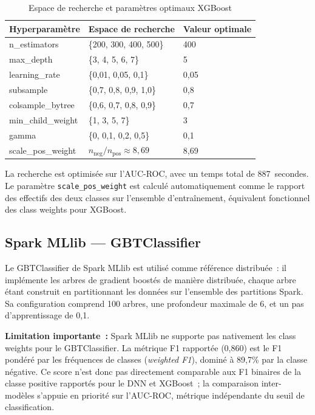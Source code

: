 \begin{table}[H]
\centering
\caption{Espace de recherche et paramètres optimaux XGBoost}
\label{tab:xgb_params}
\begin{tabular}{lll}
\toprule
\textbf{Hyperparamètre} & \textbf{Espace de recherche} & \textbf{Valeur optimale} \\
\midrule
n\_estimators      & \{200, 300, 400, 500\}         & 400 \\
max\_depth         & \{3, 4, 5, 6, 7\}              & 5 \\
learning\_rate     & \{0,01, 0,05, 0,1\}            & 0,05 \\
subsample          & \{0,7, 0,8, 0,9, 1,0\}         & 0,8 \\
colsample\_bytree  & \{0,6, 0,7, 0,8, 0,9\}         & 0,7 \\
min\_child\_weight & \{1, 3, 5, 7\}                 & 3 \\
gamma              & \{0, 0,1, 0,2, 0,5\}           & 0,1 \\
scale\_pos\_weight & $n_{\text{neg}}/n_{\text{pos}} \approx 8{,}69$ & 8,69 \\
\bottomrule
\end{tabular}
\end{table}

La recherche est optimisée sur l'AUC-ROC, avec un temps total de 887~secondes. Le paramètre \texttt{scale\_pos\_weight} est calculé automatiquement comme le rapport des effectifs des deux classes sur l'ensemble d'entraînement, équivalent fonctionnel des class weights pour XGBoost.

\subsection{Spark MLlib — GBTClassifier}

Le GBTClassifier de Spark MLlib est utilisé comme référence distribuée~: il implémente les arbres de gradient boostés de manière distribuée, chaque arbre étant construit en partitionnant les données sur l'ensemble des partitions Spark. Sa configuration comprend 100 arbres, une profondeur maximale de 6, et un pas d'apprentissage de 0,1.

\textbf{Limitation importante~:} Spark MLlib ne supporte pas nativement les class weights pour le GBTClassifier. La métrique F1 rapportée (0,860) est le F1 pondéré par les fréquences de classes (\textit{weighted F1}), dominé à 89,7\% par la classe négative. Ce score n'est donc pas directement comparable aux F1 binaires de la classe positive rapportés pour le DNN et XGBoost~; la comparaison inter-modèles s'appuie en priorité sur l'AUC-ROC, métrique indépendante du seuil de classification.

